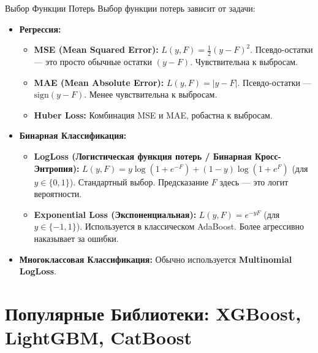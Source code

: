 \begin{textbox}{Выбор Функции Потерь}
    Выбор функции потерь зависит от задачи:
    \begin{itemize}
        \item \textbf{Регрессия:}
            \begin{itemize}
                \item \textbf{MSE (Mean Squared Error):} $L(y, F) = \frac{1}{2}(y - F)^2$. Псевдо-остатки — это просто обычные остатки $(y - F)$. Чувствительна к выбросам.
                \item \textbf{MAE (Mean Absolute Error):} $L(y, F) = |y - F|$. Псевдо-остатки — $\text{sign}(y - F)$. Менее чувствительна к выбросам.
                \item \textbf{Huber Loss:} Комбинация MSE и MAE, робастна к выбросам.
            \end{itemize}
        \item \textbf{Бинарная Классификация:}
            \begin{itemize}
                \item \textbf{LogLoss (Логистическая функция потерь / Бинарная Кросс-Энтропия):} $L(y, F) = y \log(1 + e^{-F}) + (1-y) \log(1 + e^{F})$ (для $y \in \{0, 1\}$). Стандартный выбор. Предсказание $F$ здесь — это логит вероятности.
                \item \textbf{Exponential Loss (Экспоненциальная):} $L(y, F) = e^{-yF}$ (для $y \in \{-1, 1\}$). Используется в классическом AdaBoost. Более агрессивно наказывает за ошибки.
            \end{itemize}
        \item \textbf{Многоклассовая Классификация:} Обычно используется \textbf{Multinomial LogLoss}.
    \end{itemize}
\end{textbox}

\section{Популярные Библиотеки: XGBoost, LightGBM, CatBoost}

